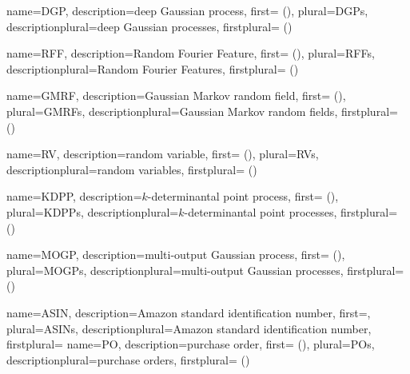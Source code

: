 {
  name={DGP},
  description={deep Gaussian process},
  first={ ()},
  plural={DGPs},
  descriptionplural={deep Gaussian processes},
  firstplural={ ()}
} 


{
  name={RFF},
  description={Random Fourier Feature},
  first={ ()},
  plural={RFFs},
  descriptionplural={Random Fourier Features},
  firstplural={ ()}
} 

{
  name={GMRF},
  description={Gaussian Markov random field},
  first={ ()},
  plural={GMRFs},
  descriptionplural={Gaussian Markov random fields},
  firstplural={ ()}
} 

{
  name={RV},
  description={random variable},
  first={ ()},
  plural={RVs},
  descriptionplural={random variables},
  firstplural={ ()}
} 
 

{
  name={KDPP},
  description={$k$-determinantal point process},
  first={ ()},
  plural={KDPPs},
  descriptionplural={$k$-determinantal point processes},
  firstplural={ ()}
} 

{
  name={MOGP},
  description={multi-output Gaussian process},
  first={ ()},
  plural={MOGPs},
  descriptionplural={multi-output Gaussian processes},
  firstplural={ ()}
} 


{
  name={ASIN},
  description={Amazon standard identification number},
  first={},
  plural={ASINs},
  descriptionplural={Amazon standard identification number},
  firstplural={}
} 
{
  name={PO},
  description={purchase order},
  first={ ()},
  plural={POs},
  descriptionplural={purchase orders},
  firstplural={ ()}
} 

